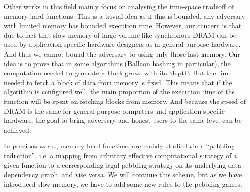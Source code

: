 Other works in this field mainly focus on analysing the time-space tradeoff of memory hard functions. This is a trivial
idea as if this is bounded, any adversary with limited memory has bounded execution time. However, our concern is that
due to fact that slow memory of large volume like synchronous DRAM can be used by application specific hardware designers
as in general purpose hardware. And thus we cannot bound the adversary to using only those fast memory. Our idea is to
prove that in some algorithms (Balloon hashing in particular), the computation needed to generate a block grows with its
`depth'. But the time needed to fetch a block of data from memory is fixed. This means that if the algorithm is configured
well, the main proportion of the execution time of the function will be spent on fetching blocks from memory. And because
the speed of DRAM is the same for general purpose computers and application-specific hardware, the goal to bring adversary
and honest users to the same level can be achieved.

In previous works, memory hard functions are mainly studied via a ``pebbling reduction'', i.e. a mapping from
arbitrary effective computational strategy of a given function to a corresponding legal pebbling strategy on its
underlying data-dependency graph, and vise versa. We will continue this scheme, but as we have introduced slow
memory, we have to add some new rules to the pebbling games.